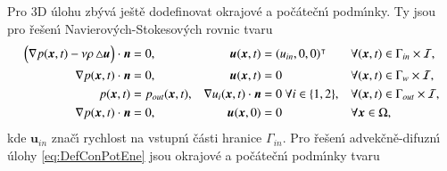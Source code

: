         Pro 3D \'{u}lohu zb\'{y}v\'{a} je\v{s}t\v{e} dodefinovat okrajov\'{e} a po\v{c}\'{a}te\v{c}n\'{\i} podm\'{\i}nky. Ty jsou pro \v{r}e\v{s}en\'{\i} Navierov\'{y}ch-Stokesov\'{y}ch rovnic tvaru
        \begin{subequations}
        \label{eq:DefCasConNSE3D}
        \begin{align}
        \Big( \nabla p(\boldsymbol{x},t) - \nu \rho \mathop{}\!\mathbin\bigtriangleup \boldsymbol{u} \Big) \cdot \boldsymbol{n} &= 0, & \boldsymbol{u} (\boldsymbol{x},t) &= (u_{in}, 0, 0)^\intercal  & &\forall (\boldsymbol{x},t) \in \Gamma_{in} \times \mathcal{I}, \label{eq:DefCasConInl3}\\
            \nabla p(\boldsymbol{x},t) \cdot \boldsymbol{n} &= 0, & \boldsymbol{u} (\boldsymbol{x},t) &= 0 & &\forall (\boldsymbol{x},t) \in \Gamma_{w} \times \mathcal{I}, \label{eq:DefCasConWal3} \\
            p(\boldsymbol{x},t) &= p_{out}(\boldsymbol{x},t), & \nabla u_i (\boldsymbol{x},t) \cdot \boldsymbol{n} &= 0 \ \forall i \in \{ 1,2 \}, & &\forall (\boldsymbol{x},t) \in \Gamma_{out} \times \mathcal{I},  \label{eq:DefCasConOut3} \\
            \nabla p(\boldsymbol{x},t) \cdot \boldsymbol{n} &= 0, & \boldsymbol{u} (\boldsymbol{x},0) &= 0 & &\forall \boldsymbol{x} \in \Omega, \label{eq:DefCasIniCon3}
        \end{align}
        \end{subequations}
        kde $\boldsymbol{u}_{in}$ zna\v{c}\'{\i} rychlost na vstupn\'{\i} \v{c}\'{a}sti hranice $\Gamma_{in}$. Pro \v{r}e\v{s}en\'{\i} advek\v{c}n\v{e}-difuzn\'{\i} \'{u}lohy \eqref{eq:DefConPotEne} jsou okrajov\'{e} a po\v{c}\'{a}te\v{c}n\'{\i} podm\'{\i}nky tvaru
